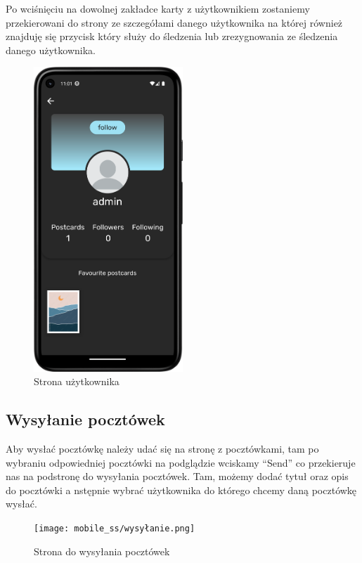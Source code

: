 \documentclass[a4paper,twoside,12pt]{book}
\begin{document}
Po wciśnięciu na dowolnej zakładce karty z użytkownikiem zostaniemy przekierowani do strony ze szczegółami danego użytkownika na której również znajduję się przycisk który służy do śledzenia lub zrezygnowania ze śledzenia danego użytkownika. 

\begin{figure}[H]
    \centering
    \includegraphics[width=0.5\textwidth]{mobile_ss/friend.png}
    \caption{Strona użytkownika}
\end{figure}

\subsection{Wysyłanie pocztówek}
Aby wysłać pocztówkę należy udać się na stronę z pocztówkami, tam po wybraniu odpowiedniej pocztówki na podglądzie wciskamy ``Send'' co przekieruje nas na podstronę do wysyłania pocztówek. Tam, możemy dodać tytuł oraz opis do pocztówki a nstępnie wybrać użytkownika do którego chcemy daną pocztówkę wysłać. 

\begin{figure}[H]
    \centering
    \texttt{[image: mobile\_ss/wysyłanie.png]}
    \caption{Strona do wysyłania pocztówek}
\end{figure}

\end{document}
